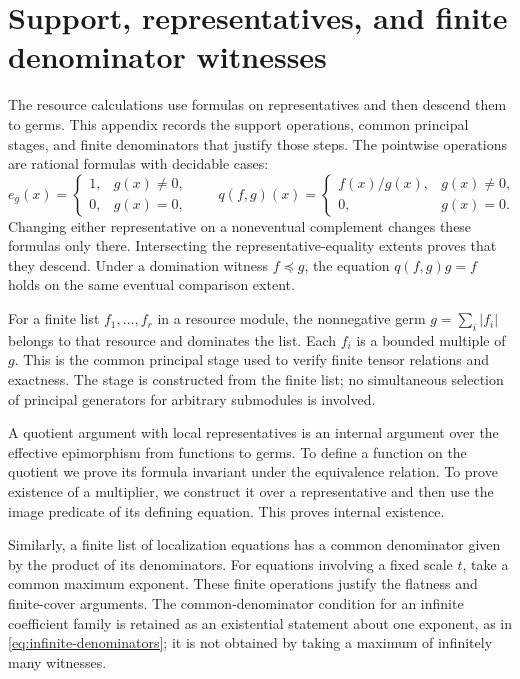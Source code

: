 \documentclass[11pt,a4paper]{article}
\numberwithin{algorithm}{section}
\numberwithin{equation}{section}
\theoremstyle{definition}
\theoremstyle{remark}
\theoremstyle{plain}
\newcommand{\abs}[1]{\lvert #1\rvert}
\theoremstyle{definition}
\theoremstyle{plain}
\begin{document}
\appendix

\section{Support, representatives, and finite denominator witnesses}
\label{app:support}
The resource calculations use formulas on representatives and
then descend them to germs. This appendix records the support
operations, common principal stages, and finite denominators
that justify those steps. The pointwise operations are rational
formulas with decidable cases:
\[
 e_g(x)=
 \begin{cases}1,&g(x)\ne0,\\0,&g(x)=0,\end{cases}
 \qquad
 q(f,g)(x)=
 \begin{cases}f(x)/g(x),&g(x)\ne0,\\0,&g(x)=0.\end{cases}
\]
Changing either representative on a noneventual complement
changes these formulas only there. Intersecting the
representative-equality extents proves that they descend.
Under a domination witness $f\preceq g$, the equation
$q(f,g)g=f$ holds on the same eventual comparison extent.

For a finite list $f_1,\ldots,f_r$ in a resource module,
the nonnegative germ $g=\sum_i\abs{f_i}$ belongs to that
resource and dominates the list. Each $f_i$ is a bounded
multiple of $g$. This is the common principal stage used
to verify finite tensor relations and exactness. The
stage is constructed from the finite list; no simultaneous
selection of principal generators for arbitrary submodules
is involved.

A quotient argument with local representatives is an
internal argument over the effective epimorphism from
functions to germs. To define a function on the quotient
we prove its formula invariant under the equivalence
relation. To prove existence of a multiplier, we construct
it over a representative and then use the image predicate
of its defining equation. This proves internal existence.

Similarly, a finite list of localization equations has a
common denominator given by the product of its denominators.
For equations involving a fixed scale $t$, take a common
maximum exponent. These finite operations justify the
flatness and finite-cover arguments.
The common-denominator condition for an infinite coefficient
family is retained as an existential statement about one
exponent, as in \eqref{eq:infinite-denominators}; it is not
obtained by taking a maximum of infinitely many witnesses.
\end{document}
